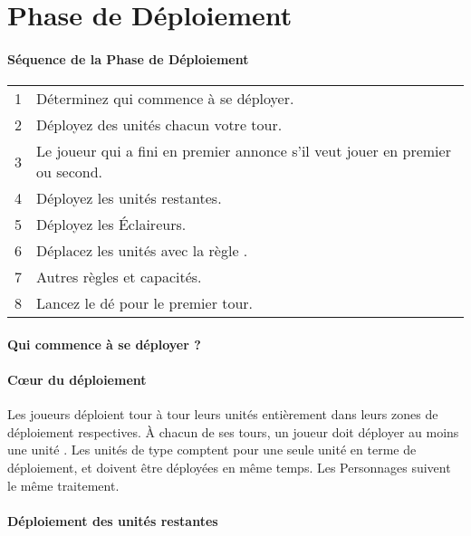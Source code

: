 
\part{Phase de Déploiement}

\subsection{Séquence de la Phase de Déploiement}

\hspace*{0.3cm}
\begin{tabular}{c|m{14cm}}
1 & Déterminez qui commence à se déployer. \tabularnewline
2 & Déployez des unités chacun votre tour. \tabularnewline
3 & Le joueur qui a fini en premier annonce s'il veut jouer en premier ou second. \tabularnewline
4 & Déployez les unités restantes. \tabularnewline
5 & Déployez les Éclaireurs. \tabularnewline
6 & Déplacez les unités avec la règle \vanguard{}. \tabularnewline
7 & Autres règles et capacités. \tabularnewline
8 & Lancez le dé pour le premier tour. \tabularnewline
\end{tabular}

\subsection{Qui commence à se déployer ?}


\subsection{Cœur du déploiement}

Les joueurs déploient tour à tour leurs unités entièrement dans leurs zones de déploiement respectives. À chacun de ses tours, un joueur doit déployer au moins une unité . Les unités de type \warmachine{} comptent pour une seule unité en terme de déploiement, et doivent être déployées en même temps. Les Personnages suivent le même traitement. 

\subsection{Déploiement des unités restantes}

